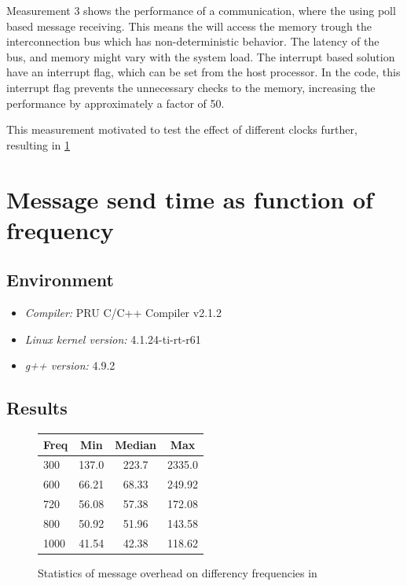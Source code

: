 Measurement 3 shows the performance of a communication, where the \pru{} using poll based message receiving. This means the \pru{} will access the  memory trough the  interconnection bus which has non-deterministic behavior. The latency of the bus, and memory might vary with the system load.
The interrupt based solution have an interrupt flag, which can be set from the host processor. In the code, this interrupt flag prevents the unnecessary checks to the  memory, increasing the performance by approximately a factor of 50.

This measurement motivated to test the effect of different \cpu{} clocks further, resulting in \cref{sec:freq}

\section{Message send time as function of \cpu{} frequency}
\label{sec:freq}

\subsection{Environment}
\begin{itemize}
	\item \emph{Compiler:} PRU C/C++ Compiler v2.1.2
	\item \emph{Linux kernel version:} 4.1.24-ti-rt-r61
	\item \emph{g++ version:} 4.9.2
\end{itemize}

\subsection{Results}

\begin{figure}
	\centering
	\caption{Statistics of message overhead on differency \cpu{} frequencies in \si{\mics}}
	\begin{tabular}{l c c c}
		\toprule
		Freq & Min & Median & Max \\
		\midrule
		\si{300}{\MHz}  & 137.0 & 223.7 & 2335.0 \\
		\si{600}{\MHz}  & 66.21 & 68.33 & 249.92 \\
		\si{720}{\MHz}  & 56.08 & 57.38 & 172.08 \\
		\si{800}{\MHz}  & 50.92 & 51.96 & 143.58 \\
		\si{1000}{\MHz} & 41.54 & 42.38 & 118.62 \\
		\bottomrule
	\end{tabular}
\label{fig:rpmsg_freq_stats}
\end{figure}

